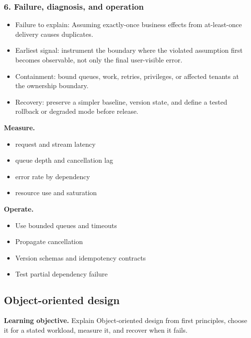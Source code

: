 \subsubsection*{6. Failure, diagnosis, and operation}
\begin{itemize}
\item Failure to explain: Assuming exactly-once business effects from at-least-once delivery causes duplicates.
\item Earliest signal: instrument the boundary where the violated assumption first becomes observable, not only the final user-visible error.
\item Containment: bound queues, work, retries, privileges, or affected tenants at the ownership boundary.
\item Recovery: preserve a simpler baseline, version state, and define a tested rollback or degraded mode before release.
\end{itemize}
\textbf{Measure.}\begin{itemize}
\item request and stream latency
\item queue depth and cancellation lag
\item error rate by dependency
\item resource use and saturation
\end{itemize}
\textbf{Operate.}\begin{itemize}
\item Use bounded queues and timeouts
\item Propagate cancellation
\item Version schemas and idempotency contracts
\item Test partial dependency failure
\end{itemize}
\subsection{Object-oriented design}
\textbf{Learning objective.} Explain Object-oriented design from first principles, choose it for a stated workload, measure it, and recover when it fails.
